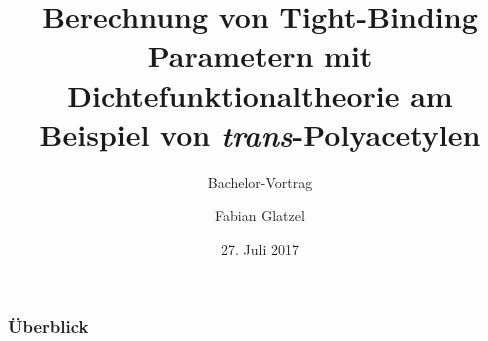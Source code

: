 \documentclass[11pt]{beamer}
\author{Fabian Glatzel}
\title[Bachelor Vortrag]{Berechnung von Tight-Binding Parametern mit Dichtefunktionaltheorie am Beispiel von \emph{trans}-Polyacetylen}
\subtitle{Bachelor-Vortrag}
\date{27. Juli 2017}
\begin{document}
\begin{frame}[plain]
	\maketitle
\end{frame}

\begin{frame}
\frametitle{Überblick}
\setcounter{tocdepth}{1}
\tableofcontents
\end{frame}




\end{document}
